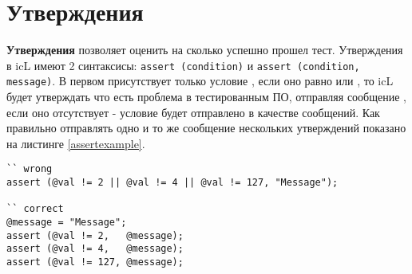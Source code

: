 \section{Утверждения}

{\bf Утверждения} позволяет оценить на сколько успешно прошел тест. Утверждения в icL имеют 2 синтаксисы: \lstinline|assert (condition)| и \lstinline|assert (condition, message)|. В первом присутствует только условие , если оно равно \false{} или \void, то icL будет утверждать что есть проблема в тестированным ПО, отправляя сообщение , если оно отсутствует - условие будет отправлено в качестве сообщений. Как правильно отправлять одно и то же сообщение нескольких утверждений показано на листинге \ref{assertexample}.

\begin{lstlisting}[caption=Пример использования утверждениях, label=assertexample]
`` wrong
assert (@val != 2 || @val != 4 || @val != 127, "Message");

`` correct
@message = "Message";
assert (@val != 2,   @message);
assert (@val != 4,   @message);
assert (@val != 127, @message);
\end{lstlisting}
